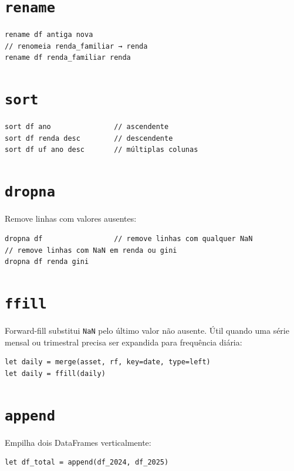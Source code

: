 \section{\texttt{rename}}

\begin{lstlisting}
rename df antiga nova
// renomeia renda_familiar → renda
rename df renda_familiar renda
\end{lstlisting}

\section{\texttt{sort}}

\begin{lstlisting}
sort df ano               // ascendente
sort df renda desc        // descendente
sort df uf ano desc       // múltiplas colunas
\end{lstlisting}

\section{\texttt{dropna}}

Remove linhas com valores ausentes:

\begin{lstlisting}
dropna df                 // remove linhas com qualquer NaN
// remove linhas com NaN em renda ou gini
dropna df renda gini
\end{lstlisting}

\section{\texttt{ffill}}

Forward-fill substitui \texttt{NaN} pelo último valor não ausente. Útil quando
uma série mensal ou trimestral precisa ser expandida para frequência diária:

\begin{lstlisting}[caption={Preenchendo uma taxa mensal em dados diários}]
let daily = merge(asset, rf, key=date, type=left)
let daily = ffill(daily)
\end{lstlisting}

\section{\texttt{append}}

Empilha dois DataFrames verticalmente:

\begin{lstlisting}
let df_total = append(df_2024, df_2025)
\end{lstlisting}

